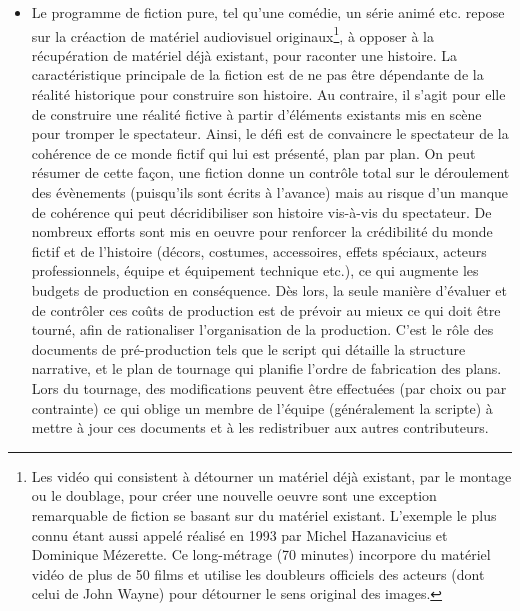 \begin{itemize}
	\item Le programme de fiction pure, tel qu'une comédie, un série animé etc. repose sur la créaction de matériel audiovisuel originaux\footnote{Les  vidéo qui consistent à détourner un matériel déjà existant, par le montage ou le doublage, pour créer une nouvelle oeuvre sont une exception remarquable de fiction se basant sur du matériel existant.
	L'exemple le plus connu étant  aussi appelé  réalisé en 1993 par Michel Hazanavicius et Dominique Mézerette. 
	Ce long-métrage (70 minutes) incorpore du matériel vidéo de plus de 50 films et utilise les doubleurs officiels des acteurs (dont celui de John Wayne) pour détourner le sens original des images.}, à opposer à la récupération de matériel déjà existant, pour raconter une histoire.
	La caractéristique principale de la fiction est de ne pas être dépendante de la réalité historique pour construire son histoire.
	Au contraire, il s'agit pour elle de construire une réalité fictive à partir d'éléments existants mis en scène pour tromper le spectateur.
	Ainsi, le défi est de convaincre le spectateur de la cohérence de ce monde fictif qui lui est présenté, plan par plan. 
	On peut résumer de cette façon, une fiction donne un contrôle total sur le déroulement des évènements (puisqu'ils sont écrits à l'avance) mais au risque d'un manque de cohérence qui peut décridibiliser son histoire vis-à-vis du spectateur.
	De nombreux efforts sont mis en oeuvre pour renforcer la crédibilité du monde fictif et de l'histoire (décors, costumes, accessoires, effets spéciaux, acteurs professionnels, équipe et équipement technique etc.), ce qui augmente les budgets de production en conséquence. 
	Dès lors, la seule manière d'évaluer et de contrôler ces coûts de production est de prévoir au mieux ce qui doit être tourné, afin de rationaliser l'organisation de la production.
	C'est le rôle des documents de pré-production tels que le script qui détaille la structure narrative, et le plan de tournage qui planifie l'ordre de fabrication des plans.
	Lors du tournage, des modifications peuvent être effectuées (par choix ou par contrainte) ce qui oblige un membre de l'équipe (généralement la scripte) à mettre à jour ces documents et à les redistribuer aux autres contributeurs.



\end{itemize}
